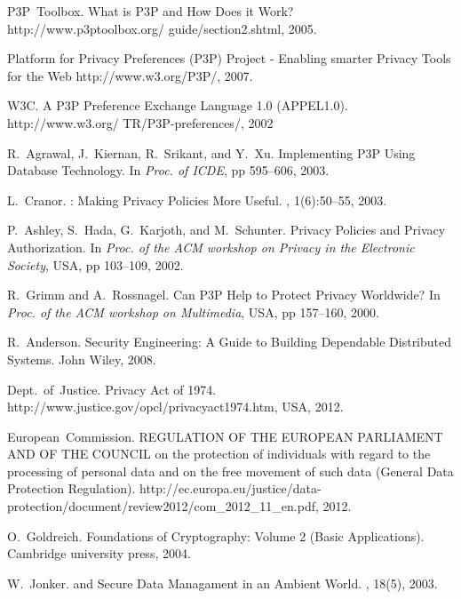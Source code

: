 \begin{thebibliography}{AH89}
P3P~Toolbox.
\newblock What is P3P and How Does it Work?
\newblock http://www.p3ptoolbox.org/ guide/section2.shtml, 2005.

\newblock Platform for Privacy Preferences {(P3P)} Project -
Enabling smarter Privacy Tools for the Web
\newblock http://www.w3.org/P3P/, 2007.

W3C.
\newblock A P3P Preference Exchange Language 1.0 (APPEL1.0).
\newblock http://www.w3.org/ TR/P3P-preferences/, 2002

R.~Agrawal, J.~Kiernan, R.~Srikant, and Y.~Xu.
\newblock Implementing {P3P} Using Database Technology.
\newblock In {\em Proc. of ICDE}, pp 595--606, 2003.

L.~Cranor.
: Making Privacy Policies More Useful.
, 1(6):50--55, 2003.

P.~Ashley, S.~Hada, G.~Karjoth, and M.~Schunter.
 Privacy Policies and Privacy Authorization.
\newblock In {\em Proc. of the ACM workshop on Privacy in the Electronic Society}, USA,
pp 103--109, 2002.

R.~Grimm and A.~Rossnagel.
\newblock Can {P3P} Help to Protect Privacy Worldwide?
\newblock In {\em Proc. of the ACM workshop on Multimedia}, USA,
pp 157--160, 2000.

R.~Anderson.
\newblock Security Engineering: A Guide to Building Dependable Distributed Systems.
\newblock John Wiley, 2008.

Dept.~of~Justice.
\newblock Privacy Act of 1974.
\newblock http://www.justice.gov/opcl/privacyact1974.htm, USA, 2012.

European~Commission.
\newblock REGULATION OF THE EUROPEAN PARLIAMENT AND OF THE COUNCIL
on the protection of individuals with regard to the processing of personal data and on
the free movement of such data (General Data Protection Regulation).
\newblock http://ec.europa.eu/justice/data-protection/document/review2012/com\_2012\_11\_en.pdf, 2012.

O.~Goldreich.
\newblock Foundations of Cryptography: Volume 2 (Basic Applications).
\newblock Cambridge university press, 2004.

W.~Jonker.
 and Secure Data Managament in an Ambient World.
, 18(5), 2003.


\end{thebibliography}
